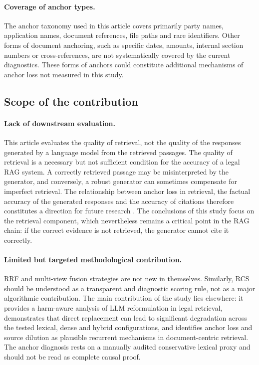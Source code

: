 \documentclass[a4paper,fleqn]{cas-dc}
\begin{document}
\paragraph{Coverage of anchor types.}
The anchor taxonomy used in this article covers
primarily party names, application names,
document references, file paths and
rare identifiers. Other forms of document
anchoring, such as specific dates, amounts,
internal section numbers or cross-references,
are not systematically covered by
the current diagnostics. These forms of anchors could
constitute additional mechanisms of anchor loss
not measured in this study.
\subsection{Scope of the contribution}
\paragraph{Lack of downstream evaluation.}
This article evaluates the quality of retrieval, not
the quality of the responses generated by a
language model from the retrieved passages. The quality of
retrieval is a necessary but not
sufficient condition for the accuracy of a legal RAG system.
A correctly retrieved passage may be misinterpreted
by the generator, and conversely, a
robust generator can sometimes compensate for
imperfect retrieval.
The relationship between anchor loss in retrieval,
the factual accuracy of the generated responses and the accuracy
of citations therefore constitutes a direction for future research
. The conclusions of this study focus on the
retrieval component, which nevertheless remains a critical point
in the RAG chain: if the correct evidence is
not retrieved, the generator cannot cite it
correctly.
\paragraph{Limited but
targeted methodological contribution.}
RRF and multi-view fusion strategies are not
new in themselves. Similarly, RCS should be understood
as a transparent and diagnostic scoring rule,
not as a major algorithmic contribution.
The main contribution of the study lies elsewhere: it
provides a harm-aware analysis of LLM reformulation in
legal retrieval, demonstrates that direct replacement can
lead to significant degradation across the tested lexical,
dense and hybrid configurations, and identifies anchor loss
and source dilution as plausible recurrent mechanisms in
document-centric retrieval. The anchor diagnosis rests on a manually audited conservative lexical
proxy and should not be read as complete causal proof.
\end{document}

